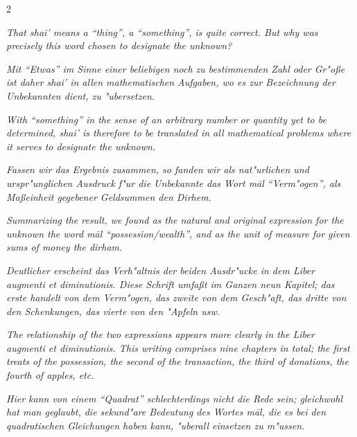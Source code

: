 \documentclass[10pt,a4paper]{article}
\newcommand{\enquote}[1]{``#1''}
\begin{document}
\begin{paracol}{2}
\switchcolumn

\textit{That \textit{shai'} means a \enquote{thing}, a \enquote{something}, is quite correct. But why was precisely this word chosen to designate the unknown?}

\switchcolumn*

\textit{Mit \enquote{Etwas} im Sinne einer beliebigen noch zu bestimmenden Zahl oder Gr"o\ss{}e ist daher \textit{shai'} in allen mathematischen Aufgaben, wo es zur Bezeichnung der Unbekannten dient, zu "ubersetzen.}

\switchcolumn

\textit{With \enquote{something} in the sense of an arbitrary number or quantity yet to be determined, \textit{shai'} is therefore to be translated in all mathematical problems where it serves to designate the unknown.}

\switchcolumn*

\textit{Fassen wir das Ergebnis zusammen, so fanden wir als nat"urlichen und urspr"unglichen Ausdruck f"ur die Unbekannte das Wort \textit{m\=al} \enquote{Verm"ogen}, als Ma\ss{}einheit gegebener Geldsummen den Dirhem.}

\switchcolumn

\textit{Summarizing the result, we found as the natural and original expression for the unknown the word \textit{m\=al} \enquote{possession/wealth}, and as the unit of measure for given sums of money the dirham.}

\switchcolumn*

\textit{Deutlicher erscheint das Verh"altnis der beiden Ausdr"ucke in dem \textit{Liber augmenti et diminutionis}. Diese Schrift umfa\ss{}t im Ganzen neun Kapitel; das erste handelt von dem Verm"ogen, das zweite von dem Gesch"aft, das dritte von den Schenkungen, das vierte von den "Apfeln usw.}

\switchcolumn

\textit{The relationship of the two expressions appears more clearly in the \textit{Liber augmenti et diminutionis}. This writing comprises nine chapters in total; the first treats of the possession, the second of the transaction, the third of donations, the fourth of apples, etc.}

\switchcolumn*

\textit{Hier kann von einem \enquote{Quadrat} schlechterdings nicht die Rede sein; gleichwohl hat man geglaubt, die sekund"are Bedeutung des Wortes \textit{m\=al}, die es bei den quadratischen Gleichungen haben kann, "uberall einsetzen zu m"ussen.}


\end{paracol}
\end{document}
